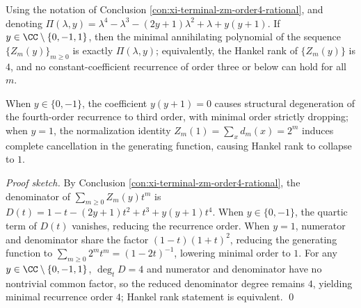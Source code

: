 \begin{conclusion}\label{con:xi-terminal-zm-hankel-rank4}
Using the notation of Conclusion \ref{con:xi-terminal-zm-order4-rational}, and denoting
\(
\Pi(\lambda,y)=\lambda^4-\lambda^3-(2y+1)\lambda^2+\lambda+y(y+1)
\).
If \(y\in\CC\setminus\{0,-1,1\}\), then
the minimal annihilating polynomial of the sequence \(\{Z_m(y)\}_{m\ge 0}\) is exactly \(\Pi(\lambda,y)\);
equivalently, the Hankel rank of \(\{Z_m(y)\}\) is \(4\), and no constant-coefficient recurrence of order three or below can hold for all \(m\).
\par
When \(y\in\{0,-1\}\), the coefficient \(y(y+1)=0\) causes structural degeneration of the fourth-order recurrence to third order, with minimal order strictly dropping;
when \(y=1\), the normalization identity \(Z_m(1)=\sum_x d_m(x)=2^m\) induces complete cancellation in the generating function, causing Hankel rank to collapse to \(1\).
\end{conclusion}
\begin{proof}[Proof sketch]
By Conclusion \ref{con:xi-terminal-zm-order4-rational}, the denominator of \(\sum_{m\ge 0}Z_m(y)t^m\) is
\(
D(t)=1-t-(2y+1)t^2+t^3+y(y+1)t^4
\).
When \(y\in\{0,-1\}\), the quartic term of \(D(t)\) vanishes, reducing the recurrence order.
When \(y=1\), numerator and denominator share the factor \((1-t)(1+t)^2\), reducing the generating function to \(\sum_{m\ge 0}2^m t^m=(1-2t)^{-1}\), lowering minimal order to \(1\).
For any \(y\in\CC\setminus\{0,-1,1\}\), \(\deg_t D=4\) and numerator and denominator have no nontrivial common factor,
so the reduced denominator degree remains \(4\), yielding minimal recurrence order \(4\); Hankel rank statement is equivalent. \qed
\end{proof}

